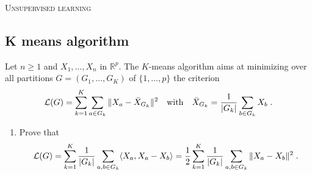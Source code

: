 \documentclass[a4paper,10pt,fleqn]{article}
\newcommand{\R}{\ensuremath{\mathbb{R}}}
\newcommand{\1}{\ensuremath{\mathbbm{1}}}
\newcommand{\crit}{\mathcal{L}}
\begin{document}
\noindent\hrulefill

\begin{center}
\textsc{Unsupervised learning}
\end{center}
\hrulefill

\medskip


\subsection*{K means algorithm}
Let $n\geqslant 1$ and  $X_{1},\ldots,X_{n}$ in $\R^p$.
The $K$-means algorithm aims at minimizing over all partitions $G=(G_{1},\ldots,G_{K})$ of $\{1,\ldots,p\}$ the criterion
$$
\crit(G)=\sum_{k=1}^K\sum_{a\in G_{k}}\|X_{a}-\bar{X}_{G_{k}}\|^2\quad \textrm{with}\quad \bar{X}_{G_{k}}={1\over |G_{k}|}\sum_{b\in G_{k}} X_{b}\;.
$$
\begin{enumerate}
\item Prove that
$$
\crit(G)=\sum_{k=1}^K{1\over |G_{k}|}\sum_{a,b\in G_{k}} \langle X_{a},X_{a}-X_{b}\rangle ={1\over 2}\sum_{k=1}^K{1\over |G_{k}|}\sum_{a,b\in G_{k}} \|X_{a}-X_{b}\|^2\;.
$$

\vspace{.2cm}


\end{enumerate}
\end{document}
